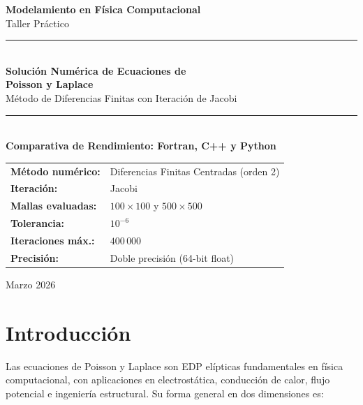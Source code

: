 \documentclass[12pt, a4paper]{article}
\begin{document}
\begin{titlepage}
  \centering
  \vspace*{1.5cm}

  {\Large \textbf{Modelamiento en Física Computacional}}\\[0.4cm]
  {\large Taller Práctico}\\[2cm]

  \rule{\linewidth}{1pt}\\[0.4cm]
  {\LARGE \textbf{Solución Numérica de Ecuaciones de}}\\[0.3cm]
  {\LARGE \textbf{Poisson y Laplace}}\\[0.3cm]
  {\large Método de Diferencias Finitas con Iteración de Jacobi}\\[0.3cm]
  \rule{\linewidth}{1pt}\\[1.5cm]

  {\large \textbf{Comparativa de Rendimiento: Fortran, C++ y Python}}\\[2cm]

  \begin{tabular}{ll}
    \textbf{Método numérico:} & Diferencias Finitas Centradas (orden 2) \\[0.2cm]
    \textbf{Iteración:}       & Jacobi \\[0.2cm]
    \textbf{Mallas evaluadas:} & $100\times100$ y $500\times500$ \\[0.2cm]
    \textbf{Tolerancia:}      & $10^{-6}$ \\[0.2cm]
    \textbf{Iteraciones máx.:} & $400\,000$ \\[0.2cm]
    \textbf{Precisión:}       & Doble precisión (64-bit float) \\
  \end{tabular}

  \vfill
  {\large Marzo 2026}
\end{titlepage}

\tableofcontents
\newpage

\section{Introducción}

Las ecuaciones de Poisson y Laplace son EDP elípticas fundamentales en
física computacional, con aplicaciones en electrostática, conducción de calor,
flujo potencial e ingeniería estructural. Su forma general en dos dimensiones es:
\end{document}
